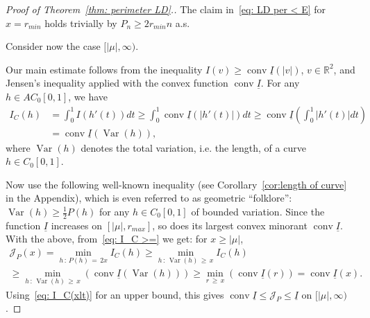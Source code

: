 \documentclass[AHL,Unicode,published]{cedram}
\DeclareMathOperator{\conv}{conv}
\newcommand{\ubar}[1]{\underline{#1}}
\newcommand{\Rbb}{\mathbb{R}}
\newcommand{\Jcl}{\mathcal{J}}
\newcommand{\Var}{\mathop{\mathrm{Var}}\nolimits}
\begin{document}
\begin{proof}[Proof of Theorem~\ref{thm: perimeter LD}.]
The claim in~\eqref{eq: LD per < E} for $x = r_{min}$ holds trivially by $P_n \ge 2 r_{min} n$ a.s.

Consider now the case $[|\mu|, \infty)$.

Our main estimate follows from the inequality $I(v) \ge \conv \ubar I(|v|)$, $v \in \Rbb^2$, and Jensen's inequality applied with the convex function $\conv \ubar I$. For any $h \in AC_0[0,1]$, we have
\begin{equation}\label{eq: I_C >=}
\begin{aligned}
I_C(h) &= \int_0^1 I(h'(t)) dt \ge \int_0^1 \conv \ubar I(|h'(t)|) dt
\ge \conv \ubar I \left(\int_0^1 |h'(t) | dt\right)  \\
&= \conv \ubar I \left(\Var(h) \right), 
\end{aligned}
\end{equation}
where $\Var(h)$ denotes the total variation, i.e. the length, of a curve $h \in C_0[0,1]$.

Now use the following well-known inequality (see Corollary~\ref{cor:length of curve} in the Appendix), which is even referred to as geometric ``folklore'': $\Var(h) \ge \frac12 P(h)$ for any $h \in C_0[0,1]$ of bounded variation. Since the function $\ubar I$ increases on $[|\mu|, r_{max}]$, so does its largest convex minorant $\conv \ubar I$. With the above, from~\eqref{eq: I_C >=} we get: for $x \ge |\mu|$,
\begin{multline}\label{eq: I_C >= 2}
\Jcl_P(x)=\min_{h\,:\,P(h)\,=\,2x} I_C(h) \ge \min_{h\,:\, \Var(h)\,\ge\,x} I_C(h) \\
\ge \min_{h\,:\,\Var(h)\,\ge\,x} \left(\conv \ubar I \left(\Var(h) \right) \right) \ge \min_{r\,\ge\,x} \left(\conv \ubar I \left(r \right) \right) = \conv \ubar I(x). 
\end{multline}
Using~\eqref{eq: I_C(xlt)} for an upper bound, this gives $\conv \ubar I \leqslant \Jcl_P \leqslant \ubar I $ on $[|\mu|, \infty)$.


\end{proof}
\end{document}
